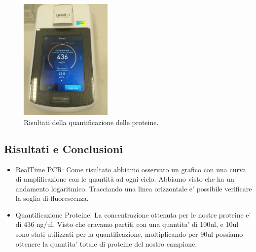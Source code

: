 \begin{figure}[H]

	\centering
	\includegraphics[width=0.4\textwidth]{./immagini/qubit3.jpg}
	\caption{Risultati della quantificazione delle proteine.}
	\label{fig:qubit3}

\end{figure}

\subsection{Risultati e Conclusioni}

\begin{itemize}
\item RealTime PCR:
Come risultato abbiamo osservato un grafico con una curva di amplificazione
con le quantit\`a ad ogni ciclo.
Abbiamo visto che ha un andamento logaritmico.
Tracciando una linea orizzontale e' possibile verificare la soglia di fluorescenza.\\

\item Quantificazione Proteine:
La concentrazione ottenuta per le nostre proteine e' di 436 ng/ul. Visto che eravamo partiti con una
quantita' di 100ul, e 10ul sono stati utilizzati per la quantificazione, moltiplicando per 90ul possiamo
ottenere la quantita' totale di proteine del nostro campione.
\end{itemize}
